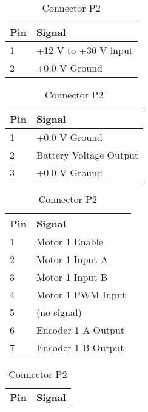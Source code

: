 \documentclass[11pt,a4paper]{article}
\begin{document}
  \begin{table}[h]
    \flushleft
    \begin{minipage}{0.45\textwidth}
      \begin{tabular}[b]{|p{7mm}|p{4.5cm}|}
        \hline \textbf{Pin} & \textbf{Signal}\\
        \hline 1 & +12 V to +30 V input\\
        \hline 2 & +0.0 V Ground\\
        \hline
      \end{tabular}
      \caption{External Power Connector X8}
      \vspace{25pt}
    \end{minipage}\hfill
    \begin{minipage}{0.45\textwidth}
      \begin{tabular}[b]{|p{7mm}|p{4.5cm}|}
        \hline \textbf{Pin} & \textbf{Signal}\\
        \hline 1 & +0.0 V Ground\\
        \hline 2 & Battery Voltage Output\\
        \hline 3 & +0.0 V Ground\\
        \hline
      \end{tabular}
      \caption{External power Connector X9}
    \end{minipage}\hfill
    \begin{minipage}{0.45\textwidth}
      \begin{tabular}[b]{|p{7mm}|p{4.5cm}|}
        \hline \textbf{Pin} & \textbf{Signal}\\
        \hline 1 & Motor 1 Enable\\
        \hline 2 & Motor 1 Input A\\
        \hline 3 & Motor 1 Input B\\
        \hline 4 & Motor 1 PWM Input\\
        \hline 5 & (no signal)\\
        \hline 6 & Encoder 1 A Output\\
        \hline 7 & Encoder 1 B Output \\
        \hline
      \end{tabular}
      \caption{Connector P2}
      \vspace{25pt}
    \end{minipage}\hfill
    \begin{minipage}{0.45\textwidth}
      \begin{tabular}[b]{|p{7mm}|p{4.5cm}|}
        \hline \textbf{Pin} & \textbf{Signal}\\

\end{tabular}
\end{minipage}
\end{table}
\end{document}
